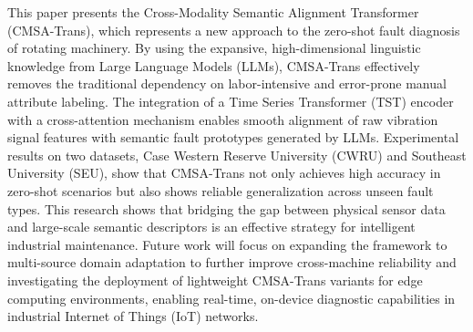 \documentclass[journal]{IEEEtran}
\begin{document}
This paper presents the Cross-Modality Semantic Alignment Transformer (CMSA-Trans), which represents a new approach to the zero-shot fault diagnosis of rotating machinery. By using the expansive, high-dimensional linguistic knowledge from Large Language Models (LLMs), CMSA-Trans effectively removes the traditional dependency on labor-intensive and error-prone manual attribute labeling. The integration of a Time Series Transformer (TST) encoder with a cross-attention mechanism enables smooth alignment of raw vibration signal features with semantic fault prototypes generated by LLMs. Experimental results on two datasets, Case Western Reserve University (CWRU) and Southeast University (SEU), show that CMSA-Trans not only achieves high accuracy in zero-shot scenarios but also shows reliable generalization across unseen fault types. This research shows that bridging the gap between physical sensor data and large-scale semantic descriptors is an effective strategy for intelligent industrial maintenance. Future work will focus on expanding the framework to multi-source domain adaptation to further improve cross-machine reliability and investigating the deployment of lightweight CMSA-Trans variants for edge computing environments, enabling real-time, on-device diagnostic capabilities in industrial Internet of Things (IoT) networks.



\end{document}
